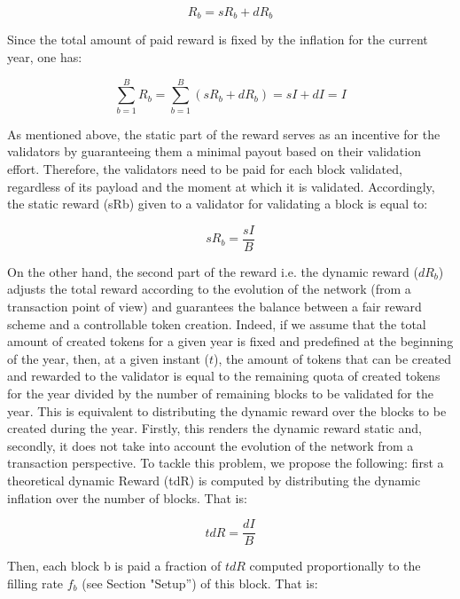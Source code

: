 \documentclass[]{article}
\begin{document}
\begin{equation}
		R_b = sR_b +dR_b
\end{equation}

Since the total amount of paid reward is fixed by the inflation for the current year, one has:

\begin{equation}
		\sum_{b=1}^{B}R_b=\sum_{b=1}^{B}(sR_b +dR_b) =sI + dI = I
\end{equation}

As mentioned above, the static part of the reward serves as an incentive for the validators by guaranteeing them a minimal payout based on their validation effort. Therefore, the validators  need to be paid for each block validated, regardless of its payload and the moment at which it is validated. Accordingly, the static reward (sRb) given to a validator for validating a block is equal to:

\begin{equation}
		sR_b=\frac{sI}{B}
\end{equation}

On the other hand, the second part of the reward i.e. the dynamic reward ($dR_b$) adjusts the total reward according to the evolution of the network (from a transaction point of view) and guarantees the balance between a fair reward scheme and a controllable token creation. Indeed, if we assume that the total amount of created tokens for a given year is fixed and predefined at the beginning of the year, then, at a given instant ($t$), the amount of tokens that can be created and rewarded to the validator is equal to the remaining quota of created tokens for the year divided by the number of remaining blocks to be validated for the year. This is equivalent to distributing the dynamic reward over the blocks to be created during the year. Firstly, this renders the dynamic reward static and, secondly, it does not take into account the evolution of the network from a transaction perspective. To tackle this problem, we propose the following: first a theoretical dynamic Reward (tdR) is computed by distributing the dynamic inflation over the number of blocks. That is:

\begin{equation}
			tdR=\frac{dI}{B}
\end{equation}

Then, each block b is paid a fraction of $tdR$ computed proportionally to the filling rate $f_b$ (see Section "Setup'') of this block. That is:
\end{document}
